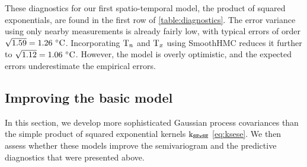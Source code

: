 These diagnostics for our first spatio-temporal model, the product of squared exponentials, are found in the first row of \autoref{table:diagnostics}. The error variance using only nearby measurements is already fairly low, with typical errors of order \(\sqrt{1.59}=1.26\,{\,^\circ}{}\mathrm{C}\). Incorporating \(\mathrm{T}_{n}\) and \(\mathrm{T}_{x}\) using SmoothHMC reduces it further to \(\sqrt{1.12}=1.06\,{\,^\circ}{}\mathrm{C}\). 
However, the model is overly optimistic, and the expected errors underestimate the empirical errors.

\subsection{Improving the basic model}
\label{sec:improving_model}

In this section, we develop more sophisticated Gaussian process covariances than the simple product of squared exponential kernels \(\operatorname{k_{\mathtt{SExSE}}}\) \autoref{eq:ksese}. 
We then assess whether these models improve the semivariogram and the predictive diagnostics that were presented above.

